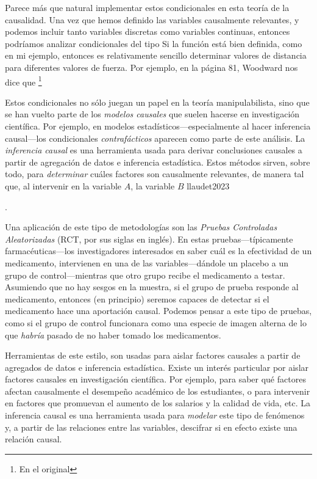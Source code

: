 {{{Parece más que natural implementar estos condicionales en
esta teoría de la causalidad. Una vez que hemos definido las
variables causalmente relevantes, y podemos
incluir tanto variables discretas como variables
continuas, entonces podríamos analizar condicionales del tipo
 Si la función está bien definida,
como en mi ejemplo, entonces es relativamente sencillo
determinar valores de distancia para diferentes valores de
fuerza. Por ejemplo, en la página 81, Woodward nos dice que
\footnote{
    En el original 
}

Estos condicionales no sólo juegan un papel en la teoría
manipulabilista, sino que se han vuelto parte de los
\emph{modelos causales} que suelen hacerse en investigación
científica. Por ejemplo, en modelos
estadísticos---especialmente al hacer inferencia
causal---los condicionales \emph{contrafácticos} aparecen
como parte de este análisis. La \emph{inferencia causal} es
una herramienta usada para derivar conclusiones causales a
partir de agregación de datos e inferencia estadística.
Estos métodos sirven, sobre todo, para \emph{determinar}
cuáles factores son causalmente relevantes, de manera tal
que, al intervenir en la variable $A$, la variable $B$
llaudet2023}.

Una aplicación de este tipo de metodologías son las \emph{Pruebas Controladas
Aleatorizadas} (RCT, por sus siglas en inglés). En estas
pruebas---típicamente farmacéuticas---los investigadores
interesados en saber cuál es la efectividad de un
medicamento, intervienen en una de las variables---dándole
un placebo a un grupo de control---mientras que otro grupo
recibe el medicamento a testar. Asumiendo que no hay sesgos
en la muestra, si el grupo de prueba responde al
medicamento, entonces (en principio) seremos capaces de
detectar si el medicamento hace una aportación causal.
Podemos pensar a este tipo de pruebas, como si el grupo de
control funcionara como una especie de imagen alterna de lo
que \emph{habría} pasado de no haber tomado los
medicamentos.

Herramientas de este estilo, son usadas para aislar factores
causales a partir de agregados de datos e inferencia
estadística. Existe un interés particular por aislar
factores causales en investigación científica. Por
ejemplo, para saber qué factores afectan causalmente el
desempeño académico de los estudiantes, o para intervenir en
factores que promuevan el aumento de los salarios y la
calidad de vida, etc. La inferencia causal es una
herramienta usada para \emph{modelar} este tipo de fenómenos
y, a partir de las relaciones entre las variables, descifrar
si en efecto existe una relación causal.

}}
